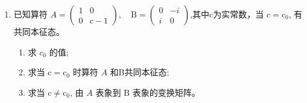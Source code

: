
\begin{enumerate}
	\item
	已知算符 $A=\left(\begin{array}{cc}1 & 0 \\ 0 & \mathrm{c}-1\end{array}\right), \quad \mathrm{B}=\left(\begin{array}{cc}0 & -i \\ i & 0\end{array}\right)$,其中c为实常数，当 $\mathrm{c}=\mathrm{c}_{0}$, 有共同本征态。
	\begin{enumerate}
		\item
		求 $c_{0}$ 的值;
		\item 
		求当 $\mathrm{c}=\mathrm{c}_{0}$ 时算符 $A$ 和B共同本征态;
		\item 
		求当 $\mathrm{c} \neq \mathrm{c}_{0}$, 由 $A$ 表象到 $\mathrm{B}$ 表象的变换矩阵。
		
		
		
	\end{enumerate}


\end{enumerate}
